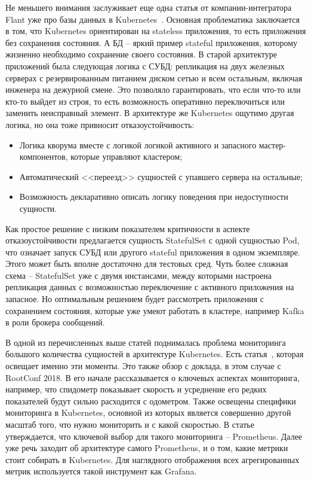 Не меньшего внимания заслуживает еще одна статья от компании-интегратора Flant уже про базы данных в Kubernetes~\cite{habr:flant:db-and-k8s}. Основная проблематика заключается в том, что Kubernetes ориентирован на stateless приложения, то есть приложения без сохранения состояния. А БД
-- яркий пример stateful приложения,
которому жизненно необходимо сохранение своего состояния. В старой архитектуре приложений была следующая логика с СУБД: репликация на двух железных серверах с резервированным питанием диском сетью и всем остальным, включая инженера на дежурной смене. Это позволяло гарантировать, что если что-то или кто-то выйдет из строя, то есть возможность оперативно переключиться или заменить неисправный элемент. В архитектуре же Kubernetes ощутимо другая логика, но она тоже привносит отказоустойчивость:
\begin{itemize}
    \item Логика кворума вместе с логикой логикой активного и запасного мастер-компонентов, которые управляют кластером;
    \item Автоматический <<переезд>> сущностей с упавшего сервера на остальные;
    \item Возможность декларативно описать логику поведения при недоступности сущности.
\end{itemize}

Как простое решение с низким показателем критичности в аспекте отказоустойчивости предлагается сущность StatefulSet с одной сущностью Pod, что означает запуск СУБД
или другого stateful приложения в одном экземпляре. Этого может быть вполне достаточно для тестовых сред. Чуть более сложная схема -- StatefulSet уже с двумя инстансами, между которыми настроена репликация данных с возможностью переключение с активного приложения на запасное. Но оптимальным решением будет рассмотреть приложения с сохранением состояния, которые уже умеют работать в кластере, например Kafka
в роли брокера сообщений.

В одной из перечисленных выше статей поднималась проблема мониторинга большого количества сущностей в архитектуре Kubernetes. Есть статья~\cite{habr:flant:k8s-mon}, которая освещает именно эти моменты. Это также обзор с доклада, в этом случае с RootConf 2018. В его начале рассказывается о ключевых аспектах мониторинга, например, что спидометр показывает скорость и усреднение его редких показателей будут сильно расходится с одометром. Также освещены специфики мониторинга в Kubernetes, основной из которых является совершенно другой масштаб того, что нужно мониторить и с какой скоростью. В статье утверждается, что ключевой выбор для такого мониторинга -- Prometheus. Далее уже речь заходит об архитектуре самого Prometheus, и о том, какие метрики стоит собирать в Kubernetes. Для наглядного отображения всех агрегированных метрик используется такой инструмент как Grafana.

